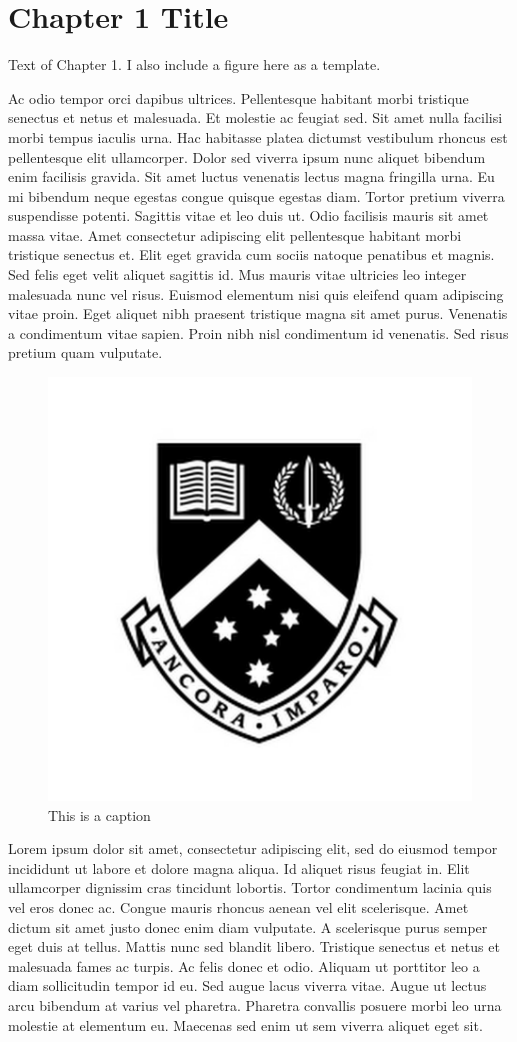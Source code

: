 \documentclass[11pt,a4paper,onecolumn]{report}
\begin{document}
\tableofcontents

\listoffigures

\chapter{Chapter 1 Title}

Text of Chapter 1. I also include a figure here as a template.

Ac odio tempor orci dapibus ultrices. Pellentesque habitant morbi tristique senectus et netus et malesuada. Et molestie ac feugiat sed. Sit amet nulla facilisi morbi tempus iaculis urna. Hac habitasse platea dictumst vestibulum rhoncus est pellentesque elit ullamcorper. Dolor sed viverra ipsum nunc aliquet bibendum enim facilisis gravida. Sit amet luctus venenatis lectus magna fringilla urna. Eu mi bibendum neque egestas congue quisque egestas diam. Tortor pretium viverra suspendisse potenti. Sagittis vitae et leo duis ut. Odio facilisis mauris sit amet massa vitae. Amet consectetur adipiscing elit pellentesque habitant morbi tristique senectus et. Elit eget gravida cum sociis natoque penatibus et magnis. Sed felis eget velit aliquet sagittis id. Mus mauris vitae ultricies leo integer malesuada nunc vel risus. Euismod elementum nisi quis eleifend quam adipiscing vitae proin. Eget aliquet nibh praesent tristique magna sit amet purus. Venenatis a condimentum vitae sapien. Proin nibh nisl condimentum id venenatis. Sed risus pretium quam vulputate.

\begin{figure}
	\centering
	\includegraphics[width=0.5\linewidth]{"Monash_Logo"}
	\caption[This is what appears in the Figure list]{This is a caption}
\end{figure}

Lorem ipsum dolor sit amet, consectetur adipiscing elit, sed do eiusmod tempor incididunt ut labore et dolore magna aliqua. Id aliquet risus feugiat in. Elit ullamcorper dignissim cras tincidunt lobortis. Tortor condimentum lacinia quis vel eros donec ac. Congue mauris rhoncus aenean vel elit scelerisque. Amet dictum sit amet justo donec enim diam vulputate. A scelerisque purus semper eget duis at tellus. Mattis nunc sed blandit libero. Tristique senectus et netus et malesuada fames ac turpis. Ac felis donec et odio. Aliquam ut porttitor leo a diam sollicitudin tempor id eu. Sed augue lacus viverra vitae. Augue ut lectus arcu bibendum at varius vel pharetra. Pharetra convallis posuere morbi leo urna molestie at elementum eu. Maecenas sed enim ut sem viverra aliquet eget sit.
\end{document}
